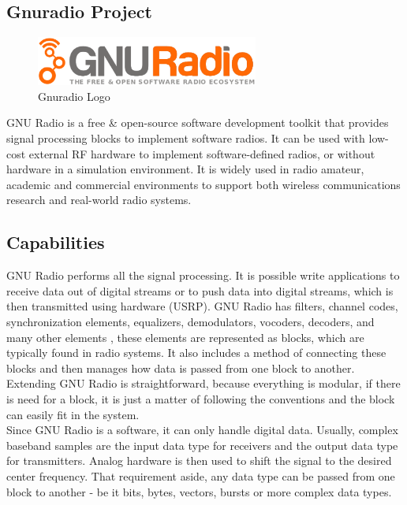 \subsection{Gnuradio Project}

\begin{figure}[htbp]
    \centering
    \includegraphics[width=0.65\textwidth]{./figures/gnuradio}
    \caption{ Gnuradio Logo
    \label{fig:gnuradiologo}}
\end{figure}

GNU Radio is a free \& open-source software development toolkit that provides
signal processing blocks to implement software radios. It can be used with
low-cost external RF hardware to implement software-defined radios, or without
hardware in a simulation environment. It is widely used in radio amateur,
academic and commercial environments to support both wireless communications
research and real-world radio systems.

\subsection{Capabilities}

GNU Radio performs all the signal processing. It is possible write applications
to receive data out of digital streams or to push data into digital streams,
which is then transmitted using hardware (USRP). GNU Radio has filters, channel
codes, synchronization elements, equalizers, demodulators, vocoders, decoders,
and many other elements , these elements are represented as blocks, which are
typically found in radio systems. It also includes a method of connecting these
blocks and then manages how data is passed from one block to another. Extending
GNU Radio is straightforward, because everything is modular, if there is need
for a block, it is just a matter of following the conventions and the block can
easily fit in the system.\\

Since GNU Radio is a software, it can only handle digital data. Usually, complex
baseband samples are the input data type for receivers and the output data type
for transmitters. Analog hardware is then used to shift the signal to the
desired center frequency. That requirement aside, any data type can be passed
from one block to another - be it bits, bytes, vectors, bursts or more complex
data types.\\

